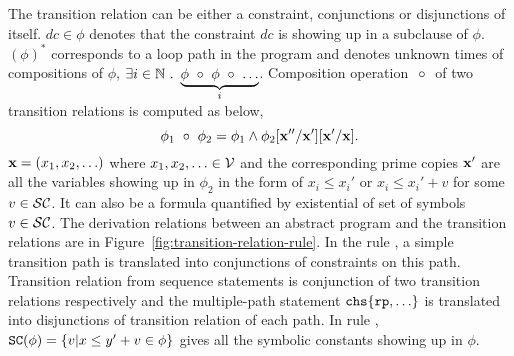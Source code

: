 The transition relation can be either a constraint, conjunctions or disjunctions of itself. $dc \in \phi$ denotes that
the constraint $dc$ is showing up in a subclause of $\phi$.
$(\phi)^*$ corresponds to a loop path in the program and denotes unknown times of compositions of
$\phi$, $\exists i \in \mathbb{N} ~.~ \underbrace{\phi ~\circ~ \phi ~\circ~ \ldots}_{i} $.
Composition operation $~\circ~$ of two transition relations is computed as below,
\[
  \phi_1 ~\circ~ \phi_2 = \phi_1 \land \phi_2[{\bf x''}/{\bf x'}][{\bf x'}/{{\bf x}}].
\]
${\bf x} = (x_1, x_2, \ldots)$ where $x_1, x_2, \ldots \in \mathcal{V}$ and the corresponding prime copies ${\bf x'}$ are all the variables showing up in $\phi_2$ in the form of
$x_i \leq x_i'$ or $x_i \leq x_i' + v$ for some $v \in \mathcal{SC}$.
It can also be a formula quantified by existential of set of symbols $v \in \mathcal{SC}$.
The derivation relations between an abstract program and the transition relations are in Figure~\ref{fig:transition-relation-rule}.
In the rule , a simple transition path is translated into conjunctions of constraints on this path.
Transition relation from sequence statements is conjunction of two transition relations respectively and the multiple-path statement $\rpchoose{\rprog, \ldots} $ is translated into disjunctions of 
transition relation of each path.
In rule ,  $\scvar({\phi}) = \left\{ v \vert x \leq y' + v \in \phi \right\} $ gives all the symbolic constants showing up in $\phi$.

